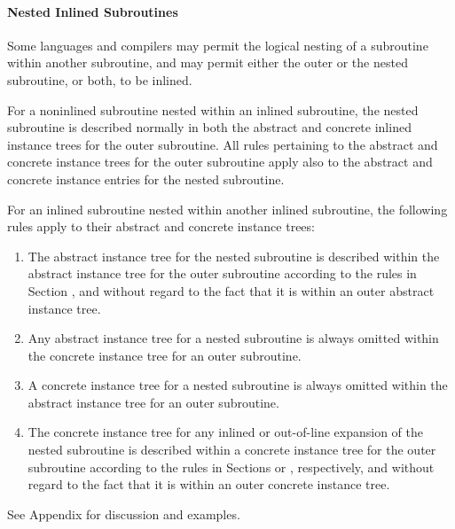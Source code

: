\paragraph{Nested Inlined Subroutines}
\label{nestedinlinedsubroutines}
Some languages and compilers may permit the logical nesting of
a subroutine within another subroutine, and may permit either
the outer or the nested subroutine, or both, to be inlined.

For a non\dash inlined subroutine nested within an inlined
subroutine, the nested subroutine is described normally in
both the abstract and concrete inlined instance trees for
the outer subroutine. All rules pertaining to the abstract
and concrete instance trees for the outer subroutine apply
also to the abstract and concrete instance entries for the
nested subroutine.

For an inlined subroutine nested within another inlined
subroutine, the following rules apply to their abstract and
concrete instance trees:

\begin{enumerate}[1.]
\item The abstract instance tree for the nested subroutine is
described within the abstract instance tree for the outer
subroutine according to the rules in 
Section , and
without regard to the fact that it is within an outer abstract
instance tree.

\item Any abstract instance tree for a nested subroutine is
always omitted within the concrete instance tree for an
outer subroutine.

\item  A concrete instance tree for a nested subroutine is
always omitted within the abstract instance tree for an
outer subroutine.

\item The concrete instance tree for any inlined or out-of-line
expansion of the nested subroutine is described within a
concrete instance tree for the outer subroutine according
to the rules in 
Sections  or 
, respectively,
and without regard to the fact that it is within an outer
concrete instance tree.
\end{enumerate}

See Appendix  
for discussion and examples.

